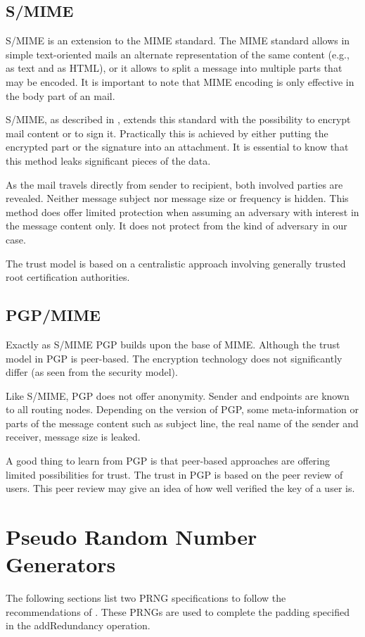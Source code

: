 \subsection{S/MIME}
S/MIME is an extension to the MIME standard. The MIME standard allows in simple text-oriented mails an alternate representation of the same content (e.g., as text and as HTML), or it allows to split a message into multiple parts that may be encoded. It is important to note that MIME encoding is only effective in the body part of an mail.

S/MIME, as described in \cite{RFC3851}, extends this standard with the possibility to encrypt mail content or to sign it. Practically this is achieved by either putting the encrypted part or the signature into an attachment. It is essential to know that this method leaks significant pieces of the data.

As the mail travels directly from sender to recipient, both involved parties are revealed. Neither message subject nor message size or frequency is hidden. This method does offer limited protection when assuming an adversary with interest in the message content only. It does not protect from the kind of adversary in our case. 

The trust model is based on a centralistic approach involving generally trusted root certification authorities.

\subsection{PGP/MIME}
Exactly as S/MIME PGP\cite{RFC4880} builds upon the base of MIME. Although the trust model in PGP is peer-based. The encryption technology does not significantly differ (as seen from the security model).

Like S/MIME, PGP does not offer anonymity. Sender and endpoints are known to all routing nodes. Depending on the version of PGP, some meta-information or parts of the message content such as subject line, the real name of the sender and receiver, message size is leaked.

A good thing to learn from PGP is that peer-based approaches are offering limited possibilities for trust. The trust in PGP is based on the peer review of users. This peer review may give an idea of how well verified the key of a user is.


\section{Pseudo Random Number Generators \label{sec:prng}}
The following sections list two PRNG specifications to follow the recommendations of \cite{RFC1750}. These PRNGs are used to complete the padding specified in the addRedundancy operation.

